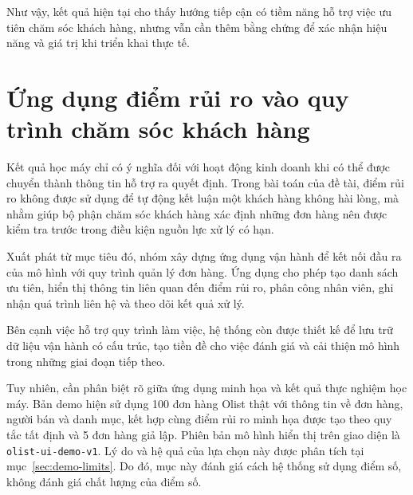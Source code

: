 \documentclass[12pt,a4paper]{report}
\begin{document}
Như vậy, kết quả hiện tại cho thấy hướng tiếp cận có tiềm năng hỗ trợ việc ưu tiên chăm sóc khách hàng, nhưng vẫn cần thêm bằng chứng để xác nhận hiệu năng và giá trị khi triển khai thực tế.

\section{Ứng dụng điểm rủi ro vào quy trình chăm sóc khách hàng}\label{sec:demo}

Kết quả học máy chỉ có ý nghĩa đối với hoạt động kinh doanh khi có thể được chuyển thành thông tin hỗ trợ ra quyết định. Trong bài toán của đề tài, điểm rủi ro không được sử dụng để tự động kết luận một khách hàng không hài lòng, mà nhằm giúp bộ phận chăm sóc khách hàng xác định những đơn hàng nên được kiểm tra trước trong điều kiện nguồn lực xử lý có hạn.

Xuất phát từ mục tiêu đó, nhóm xây dựng ứng dụng vận hành để kết nối đầu ra của mô hình với quy trình quản lý đơn hàng. Ứng dụng cho phép tạo danh sách ưu tiên, hiển thị thông tin liên quan đến điểm rủi ro, phân công nhân viên, ghi nhận quá trình liên hệ và theo dõi kết quả xử lý.

Bên cạnh việc hỗ trợ quy trình làm việc, hệ thống còn được thiết kế để lưu trữ dữ liệu vận hành có cấu trúc, tạo tiền đề cho việc đánh giá và cải thiện mô hình trong những giai đoạn tiếp theo.

Tuy nhiên, cần phân biệt rõ giữa ứng dụng minh họa và kết quả thực nghiệm học máy. Bản demo hiện sử dụng 100 đơn hàng Olist thật với thông tin về đơn hàng, người bán và danh mục, kết hợp cùng điểm rủi ro minh họa được tạo theo quy tắc tất định và 5 đơn hàng giả lập. Phiên bản mô hình hiển thị trên giao diện là \texttt{olist-ui-demo-v1}. Lý do và hệ quả của lựa chọn này được phân tích tại mục~\ref{sec:demo-limits}. Do đó, mục này đánh giá cách hệ thống sử dụng điểm số, không đánh giá chất lượng của điểm số.

\end{document}
